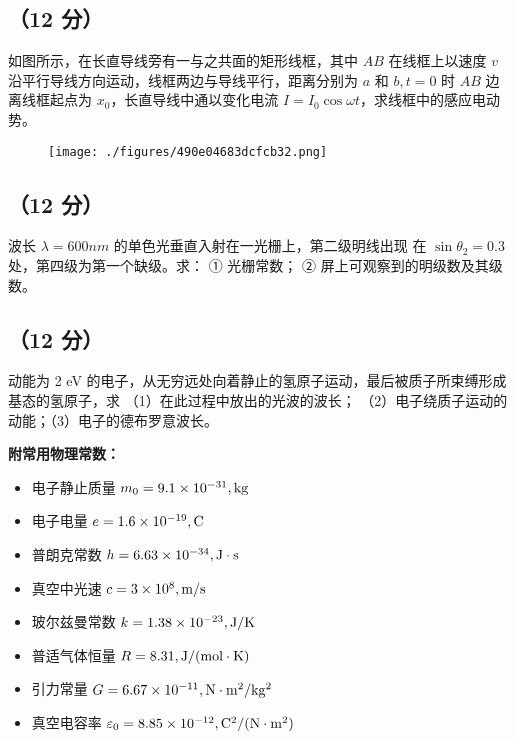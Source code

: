 \subsection{（12 分）}如图所示，在长直导线旁有一与之共面的矩形线框，其中 $AB$ 在线框上以速度 $v$ 沿平行导线方向运动，线框两边与导线平行，距离分别为 $a$ 和 $b,t=0$ 时 $AB$ 边离线框起点为 $x_0$，长直导线中通以变化电流 $I = I_0 \cos{\omega t}$，求线框中的感应电动势。
\begin{figure}[ht]
\centering
\texttt{[image: ./figures/490e04683dcfcb32.png]}
\caption{} \label{fig_NIU06_7}
\end{figure}

\subsection{（12 分）}波长 $\lambda = 600 nm$ 的单色光垂直入射在一光栅上，第二级明线出现 在 $\sin{\theta_2} = 0.3$ 处，第四级为第一个缺级。求： ① 光栅常数； ② 屏上可观察到的明级数及其级数。

\subsection{（12 分）}动能为 2 eV 的电子，从无穷远处向着静止的氢原子运动，最后被质子所束缚形成基态的氢原子，求 （1）在此过程中放出的光波的波长； （2）电子绕质子运动的动能；（3）电子的德布罗意波长。

\textbf{附常用物理常数：}
\begin{itemize}
    \item 电子静止质量 $m_0 = 9.1 \times 10^{-31} \\, \mathrm{kg}$
    \item 电子电量 $e = 1.6 \times 10^{-19} \\, \mathrm{C}$
    \item 普朗克常数 $h = 6.63 \times 10^{-34} \\, \mathrm{J \cdot s}$
    \item 真空中光速 $c = 3 \times 10^8 \\, \mathrm{m/s}$
    \item 玻尔兹曼常数 $k = 1.38 \times 10^{-23} \\, \mathrm{J/K}$
    \item 普适气体恒量 $R = 8.31 \\, \mathrm{J/(mol \cdot K)}$
    \item 引力常量 $G = 6.67 \times 10^{-11} \\, \mathrm{N \cdot m^2 / kg^2}$
    \item 真空电容率 $\varepsilon_0 = 8.85 \times 10^{-12} \\, \mathrm{C^2 / (N \cdot m^2)}$
\end{itemize}

